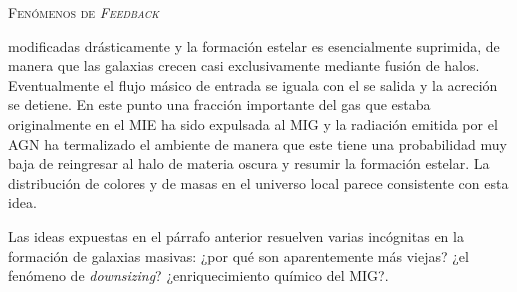 \documentclass[xcolor=dvipsnames,4pt,hyperref={colorlinks,citecolor=black,linkcolor=black,urlcolor=black}]{beamer}
\begin{document}
\begin{frame}[allowframebreaks]{\textsc{Fenómenos de \emph{Feedback}}}
\begin{description}
modificadas drásticamente y la formación estelar es esencialmente suprimida, de manera que las
galaxias crecen casi exclusivamente mediante fusión de halos. Eventualmente el flujo másico de
entrada se iguala con el se salida y la acreción se detiene. En este punto una fracción importante
del gas que estaba originalmente en el MIE ha sido expulsada al MIG y la radiación emitida por el
AGN ha termalizado el ambiente de manera que este tiene una probabilidad muy baja de reingresar al
halo de materia oscura y resumir la formación estelar. La distribución de colores y de masas en el
universo local parece consistente con esta idea.

Las ideas expuestas en el párrafo anterior resuelven varias incógnitas en la formación de galaxias
masivas: ¿por qué son aparentemente más viejas? ¿el fenómeno de \emph{downsizing}? ¿enriquecimiento
químico del MIG?.
%
\end{description}
%
\end{frame}
\end{document}
